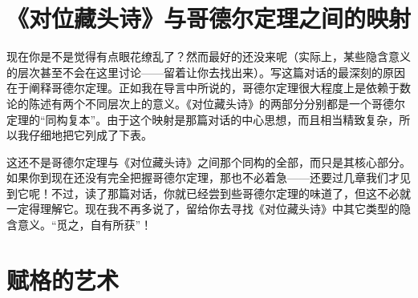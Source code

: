 \section{《对位藏头诗》与哥德尔定理之间的映射}

现在你是不是觉得有点眼花缭乱了？然而最好的还没来呢（实际上，某些隐含意义的层次甚至不会在这里讨论——留着让你去找出来）。写这篇对话的最深刻的原因在于阐释哥德尔定理。正如我在导言中所说的，哥德尔定理很大程度上是依赖于数论的陈述有两个不同层次上的意义。《对位藏头诗》的两部分分别都是一个哥德尔定理的“同构复本”。由于这个映射是那篇对话的中心思想，而且相当精致复杂，所以我仔细地把它列成了下表。


这还不是哥德尔定理与《对位藏头诗》之间那个同构的全部，而只是其核心部分。如果你到现在还没有完全把握哥德尔定理，那也不必着急——还要过几章我们才见到它呢！不过，读了那篇对话，你就已经尝到些哥德尔定理的味道了，但这不必就一定得理解它。现在我不再多说了，留给你去寻找《对位藏头诗》中其它类型的隐含意义。“觅之，自有所获”！

\section{赋格的艺术}

